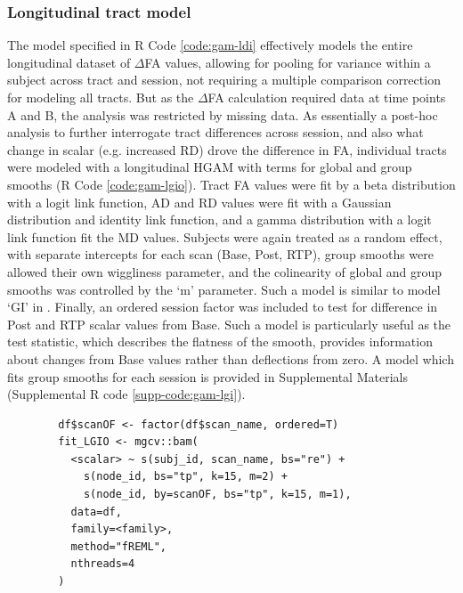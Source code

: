 \documentclass[12pt]{article}
\begin{document}
\subsubsection{Longitudinal tract model}
\label{sssec:meth-gam-lgio}
The model specified in R Code \ref{code:gam-ldi} effectively models the entire longitudinal dataset of $\Delta$FA values, allowing for pooling for variance within a subject across tract and session, not requiring a multiple comparison correction for modeling all tracts. But as the $\Delta$FA calculation required data at time points A and B, the analysis was restricted by missing data. As essentially a post-hoc analysis to further interrogate tract differences across session, and also what change in scalar (e.g. increased RD) drove the difference in FA, individual tracts were modeled with a longitudinal HGAM with terms for global and group smooths (R Code \ref{code:gam-lgio}). Tract FA values were fit by a beta distribution with a logit link function, AD and RD values were fit with a Gaussian distribution and identity link function, and a gamma distribution with a logit link function fit the MD values. Subjects were again treated as a random effect, with separate intercepts for each scan (Base, Post, RTP), group smooths were allowed their own wiggliness parameter, and the colinearity of global and group smooths was controlled by the `m' parameter. Such a model is similar to model `GI' in \textcite{pedersen2019HierarchicalGeneralizedAdditive}. Finally, an ordered session factor was included to test for difference in Post and RTP scalar values from Base. Such a model is particularly useful as the test statistic, which describes the flatness of the smooth, provides information about changes from Base values rather than deflections from zero. A model which fits group smooths for each session is provided in Supplemental Materials (Supplemental R code \ref{supp-code:gam-lgi}).

\begin{equ}[H]
	\begin{lstlisting}
		df$scanOF <- factor(df$scan_name, ordered=T)
		fit_LGIO <- mgcv::bam(
		  <scalar> ~ s(subj_id, scan_name, bs="re") +
		    s(node_id, bs="tp", k=15, m=2) +
		    s(node_id, by=scanOF, bs="tp", k=15, m=1),
		  data=df,
		  family=<family>,
		  method="fREML",
		  nthreads=4
		)
	\end{lstlisting}
	\caption{Tract scalars are modeled as a function of tract node with thin-plate regression splines using both global and group (\lstinline{scan_name}) smooths as well as individual group wiggliness. An ordered factor of scan session was used to compare Post and RTP to Base. \lstinline{<scalar>} = relevant DWI metric (AD, RD, MD, or FA), \lstinline{scan_name} = session identifier factor (Base, Post, RTP), \lstinline{scanOf} = ordered factor of \lstinline{scan_name}, \lstinline{<family>} = relevant family and link function for scalar distribution.}
	\label{code:gam-lgio}
\end{equ}
\end{document}
